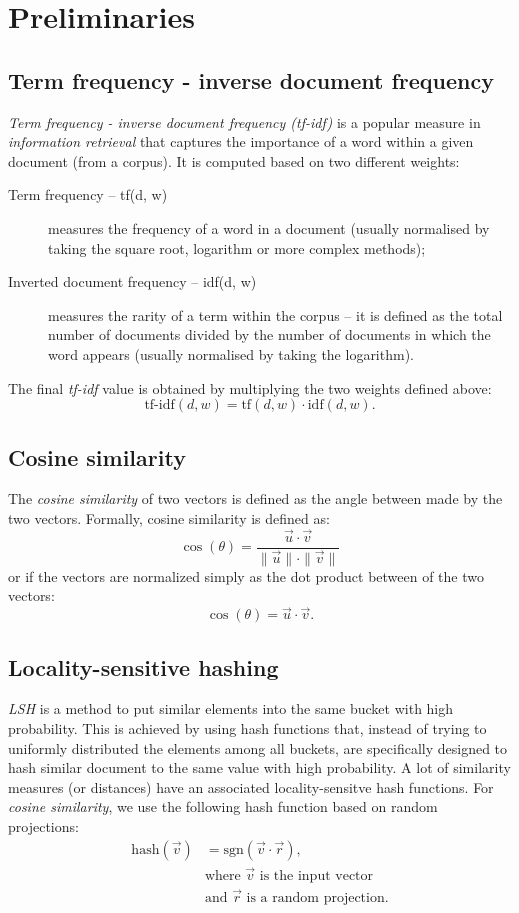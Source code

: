 \chapter{Preliminaries}

\section{Term frequency - inverse document frequency}
\label{sec:tf-idf}

\emph{Term frequency - inverse document frequency (tf-idf)}
\cite{salton1988term} is a popular measure in \emph{information retrieval} that
captures the importance of a word within a given document (from a corpus).
It is computed based on two different weights:
\begin{description}
  \item[Term frequency -- tf(d, w)] measures the frequency of a word in a
  document (usually normalised by taking the square root, logarithm or more
  complex methods);
  \item[Inverted document frequency -- idf(d, w)] measures the rarity of a term
  within the corpus -- it is defined as the total number of documents divided
  by the number of documents in which the word appears (usually normalised by
  taking the logarithm).
\end{description}
The final \emph{tf-idf} value is obtained by multiplying the two weights
defined above:
\[ \text{tf-idf}(d, w) = \text{tf}(d, w) \cdot \text{idf}(d, w). \]

\section{Cosine similarity}

The \emph{cosine similarity} of two vectors is defined as the angle between
made by the two vectors.
Formally, cosine similarity is defined as:
\[\cos(\theta) = \frac{\vec{u} \cdot \vec{v}}{\|\vec{u}\| \cdot \|\vec{v}\|}\]
or if the vectors are normalized simply as the dot product between of the two
vectors:
\[\cos(\theta) = \vec{u} \cdot \vec{v}.\]

\section{Locality-sensitive hashing}
\label{sec:lsh}

\emph{\ac{LSH}} \cite{rajaraman2012mining} is a method to put similar elements
into the same bucket with high probability. This is achieved by using hash
functions that, instead of trying to uniformly distributed the elements among
all buckets, are specifically designed to hash similar document to the same
value with high probability.
A lot of similarity measures (or distances) have an associated
locality-sensitve hash functions. For \emph{cosine similarity}, we use the
following hash function based on random projections:
\begin{align*}
  \text{hash}(\vec{v}) &= \text{sgn}(\vec{v} \cdot \vec{r}), \\
  &\text{where \(\vec{v}\) is the input vector} \\
  &\text{and \(\vec{r}\) is a random projection.}
\end{align*}


